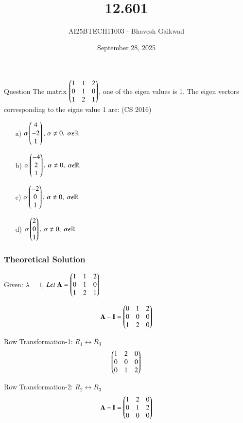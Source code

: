 \documentclass{beamer}
\title
{12.601}
\date{September 28, 2025}
\author 
{AI25BTECH11003 - Bhavesh Gaikwad}
\begin{document}
\frame{\titlepage}
\begin{frame}{Question}
The matrix $\begin{pmatrix}1 & 1 & 2 \\ 0 & 1 & 0 \\ 1 & 2 & 1\end{pmatrix}$, one of the eigen values is 1. The eigen vectors corresponding to the eigne value 1 are:
\hfill{(CS 2016)}
\begin{itemize}
    \item[a)] $\alpha\begin{pmatrix}4 \\ -2 \\ 1\end{pmatrix}, \, \alpha \neq 0, \; \alpha \epsilon \mathbb{R}$
    \item[b)] $\alpha\begin{pmatrix}-4 \\ 2 \\ 1\end{pmatrix}, \, \alpha \neq 0, \; \alpha \epsilon \mathbb{R}$
    \item[c)]$\alpha\begin{pmatrix}-2 \\ 0 \\ 1\end{pmatrix}, \, \alpha \neq 0, \; \alpha \epsilon \mathbb{R}$
    \item[d)]$\alpha\begin{pmatrix}2 \\ 0 \\ 1\end{pmatrix}, \, \alpha \neq 0, \; \alpha \epsilon \mathbb{R}$
\end{itemize}
\end{frame}


\begin{frame}[fragile]
    \frametitle{Theoretical Solution}
Given: $\lambda = 1$, $Let \; \mathbf{A} = \begin{pmatrix}1 & 1 & 2 \\ 0 & 1 & 0 \\ 1 & 2 & 1\end{pmatrix}$

\begin{equation}
    \mathbf{A} - \mathbf{I} = \begin{pmatrix}0 & 1 & 2 \\ 0 & 0 & 0 \\ 1 & 2 & 0\end{pmatrix}
\end{equation}

Row Transformation-1: $R_1 \leftrightarrow R_3$
\begin{equation}
\begin{pmatrix}1 & 2 & 0 \\ 0 & 0 & 0 \\ 0 & 1 & 2\end{pmatrix}
\end{equation}

Row Transformation-2: $R_2 \leftrightarrow R_3$
\begin{equation}
   \mathbf{A} - \mathbf{I} = \begin{pmatrix}1 & 2 & 0 \\ 0 & 1 & 2 \\ 0 & 0 & 0\end{pmatrix}
\end{equation}
\end{frame}
\end{document}
